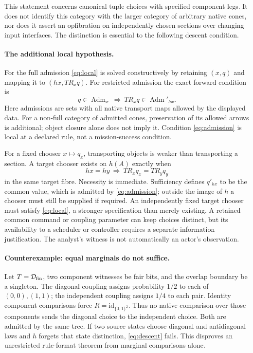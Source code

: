 \documentclass[11pt]{article}
\newcommand{\Adm}{\operatorname{Adm}}
\newcommand{\id}{\mathrm{id}}
\begin{document}
This statement concerns canonical tuple choices with specified component legs. It does not identify this category with the larger category of arbitrary native cones, nor does it assert an opfibration on independently chosen sections over changing input interfaces. The distinction is essential to the following descent condition.

\paragraph{The additional local hypothesis.} For the full admission \eqref{eq:local} is solved constructively by retaining $(x,q)$ and mapping it to $(hx,TR_xq)$. For restricted admission the exact forward condition is
\[
 q\in\Adm_x\ \Longrightarrow\ TR_xq\in\Adm'_{hx}. \tag{A}\label{eq:admission}
\]
Here admissions are sets with all native transport maps allowed by the displayed data. For a non-full category of admitted cones, preservation of its allowed arrows is additional; object closure alone does not imply it. Condition \eqref{eq:admission} is local at a declared rule, not a mission-success condition.

For a fixed chooser $x\mapsto q_x$, transporting objects is weaker than transporting a section. A target chooser exists on $h(A)$ exactly when
\[
 hx=hy\ \Longrightarrow\ TR_xq_x=TR_yq_y \tag{D}\label{eq:descent}
\]
in the same target fibre. Necessity is immediate. Sufficiency defines $q'_{hx}$ to be the common value, which is admitted by \eqref{eq:admission}; outside the image of $h$ a chooser must still be supplied if required. An independently fixed target chooser must satisfy \eqref{eq:local}, a stronger specification than merely existing. A retained common command or coupling parameter can keep choices distinct, but its availability to a scheduler or controller requires a separate information justification. The analyst's witness is not automatically an actor's observation.

\paragraph{Counterexample: equal marginals do not suffice.} Let $T=\mathcal D_{\rm fin}$, two component witnesses be fair bits, and the overlap boundary be a singleton. The diagonal coupling assigns probability $1/2$ to each of $(0,0),(1,1)$; the independent coupling assigns $1/4$ to each pair. Identity component comparisons force $R=\id_{\{0,1\}^2}$. Thus no native comparison over those components sends the diagonal choice to the independent choice. Both are admitted by the same tree. If two source states choose diagonal and antidiagonal laws and $h$ forgets that state distinction, \eqref{eq:descent} fails. This disproves an unrestricted rule-format theorem from marginal comparisons alone.
\end{document}
